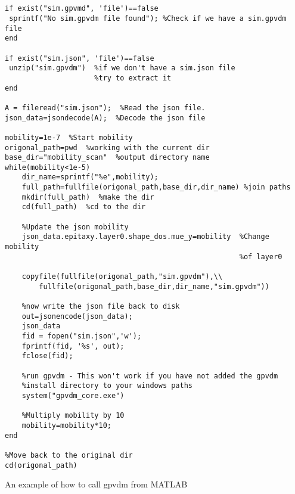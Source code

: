 \begin{listing}
\begin{verbatim}


if exist("sim.gpvmd", 'file')==false
 sprintf("No sim.gpvdm file found"); %Check if we have a sim.gpvdm file
end

if exist("sim.json", 'file')==false
 unzip("sim.gpvdm")  %if we don't have a sim.json file
					 %try to extract it
end

A = fileread("sim.json");  %Read the json file.
json_data=jsondecode(A);  %Decode the json file

mobility=1e-7  %Start mobility
origonal_path=pwd  %working with the current dir
base_dir="mobility_scan"  %output directory name
while(mobility<1e-5)
    dir_name=sprintf("%e",mobility);
    full_path=fullfile(origonal_path,base_dir,dir_name)	%join paths
    mkdir(full_path)  %make the dir
    cd(full_path)  %cd to the dir

	%Update the json mobility
    json_data.epitaxy.layer0.shape_dos.mue_y=mobility  %Change mobility
													   %of layer0
    
    copyfile(fullfile(origonal_path,"sim.gpvdm"),\\
		fullfile(origonal_path,base_dir,dir_name,"sim.gpvdm"))

	%now write the json file back to disk
    out=jsonencode(json_data);
    json_data
    fid = fopen("sim.json",'w');
    fprintf(fid, '%s', out);
    fclose(fid);

	%run gpvdm - This won't work if you have not added the gpvdm
	%install directory to your windows paths 
    system("gpvdm_core.exe")
    
	%Multiply mobility by 10
    mobility=mobility*10;
end

%Move back to the original dir
cd(origonal_path)

\end{verbatim}
\caption{An example of how to call gpvdm from MATLAB} 
\label{matlab-example}
\end{listing}
